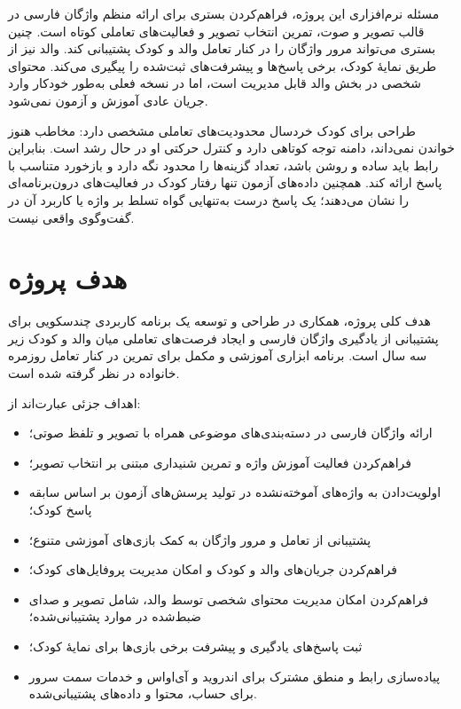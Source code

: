مسئله نرم‌افزاری این پروژه، فراهم‌کردن بستری برای ارائه منظم واژگان فارسی در قالب تصویر و صوت، تمرین انتخاب تصویر و فعالیت‌های تعاملی کوتاه است. چنین بستری می‌تواند مرور واژگان را در کنار تعامل والد و کودک پشتیبانی کند. والد نیز از طریق نمایهٔ کودک، برخی پاسخ‌ها و پیشرفت‌های ثبت‌شده را پیگیری می‌کند. محتوای شخصی در بخش والد قابل مدیریت است، اما در نسخه فعلی به‌طور خودکار وارد جریان عادی آموزش و آزمون نمی‌شود.

طراحی برای کودک خردسال محدودیت‌های تعاملی مشخصی دارد: مخاطب هنوز خواندن نمی‌داند، دامنه توجه کوتاهی دارد و کنترل حرکتی او در حال رشد است. بنابراین رابط باید ساده و روشن باشد، تعداد گزینه‌ها را محدود نگه دارد و بازخورد متناسب با پاسخ ارائه کند. همچنین داده‌های آزمون تنها رفتار کودک در فعالیت‌های درون‌برنامه‌ای را نشان می‌دهند؛ یک پاسخ درست به‌تنهایی گواه تسلط بر واژه یا کاربرد آن در گفت‌وگوی واقعی نیست.

\section{هدف پروژه}

هدف کلی پروژه، همکاری در طراحی و توسعه یک برنامه کاربردی چندسکویی برای پشتیبانی از یادگیری واژگان فارسی و ایجاد فرصت‌های تعاملی میان والد و کودک زیر سه سال است. برنامه ابزاری آموزشی و مکمل برای تمرین در کنار تعامل روزمره خانواده در نظر گرفته شده است.

اهداف جزئی عبارت‌اند از:
\begin{itemize}
    \item ارائه واژگان فارسی در دسته‌بندی‌های موضوعی همراه با تصویر و تلفظ صوتی؛
    \item فراهم‌کردن فعالیت آموزش واژه و تمرین شنیداری مبتنی بر انتخاب تصویر؛
    \item اولویت‌دادن به واژه‌های آموخته‌نشده در تولید پرسش‌های آزمون بر اساس سابقه پاسخ کودک؛
    \item پشتیبانی از تعامل و مرور واژگان به کمک بازی‌های آموزشی متنوع؛
    \item فراهم‌کردن جریان‌های والد و کودک و امکان مدیریت پروفایل‌های کودک؛
    \item فراهم‌کردن امکان مدیریت محتوای شخصی توسط والد، شامل تصویر و صدای ضبط‌شده در موارد پشتیبانی‌شده؛
    \item ثبت پاسخ‌های یادگیری و پیشرفت برخی بازی‌ها برای نمایهٔ کودک؛
    \item پیاده‌سازی رابط و منطق مشترک برای اندروید و آی‌اواس و خدمات سمت سرور برای حساب، محتوا و داده‌های پشتیبانی‌شده.
\end{itemize}

